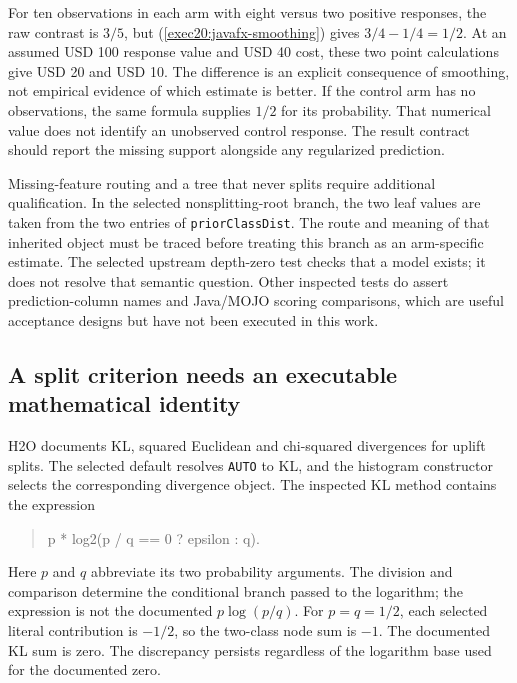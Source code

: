 For ten observations in each arm with eight versus two positive responses,
the raw contrast is $3/5$, but (\ref{exec20:javafx-smoothing}) gives
$3/4-1/4=1/2$. At an assumed USD 100 response value and USD 40 cost, these
two point calculations give USD 20 and USD 10. The difference is an explicit
consequence of smoothing, not empirical evidence of which estimate is better.
If the control arm has no observations, the same formula supplies $1/2$ for
its probability. That numerical value does not identify an unobserved control
response. The result contract should report the missing support alongside any
regularized prediction.
\citep{exec20_javaeffects_reference}

Missing-feature routing and a tree that never splits require additional
qualification. In the selected nonsplitting-root branch, the two leaf values
are taken from the two entries of \texttt{priorClassDist}. The route and
meaning of that inherited object must be traced before treating this branch
as an arm-specific estimate. The selected upstream depth-zero test checks that
a model exists; it does not resolve that semantic question. Other inspected
tests do assert prediction-column names and Java/MOJO scoring comparisons,
which are useful acceptance designs but have not been executed in this work.
\citep{exec20_javaeffects_h2o}

\subsection{A split criterion needs an executable mathematical identity}
\label{exec20:javafx-split}

H2O documents KL, squared Euclidean and chi-squared divergences for uplift
splits. The selected default resolves \texttt{AUTO} to KL, and the histogram
constructor selects the corresponding divergence object. The inspected KL
method contains the expression
\begin{quote}
\ttfamily\small
p * log2(p / q == 0 ? epsilon : q).
\end{quote}
Here $p$ and $q$ abbreviate its two probability arguments. The division and
comparison determine the conditional branch passed to the logarithm; the
expression is not the documented $p\log(p/q)$. For $p=q=1/2$, each selected
literal contribution is $-1/2$, so the two-class node sum is $-1$. The
documented KL sum is zero. The discrepancy persists regardless of the
logarithm base used for the documented zero.
\citep{exec20_javaeffects_h2o,exec20_javaeffects_reference}

